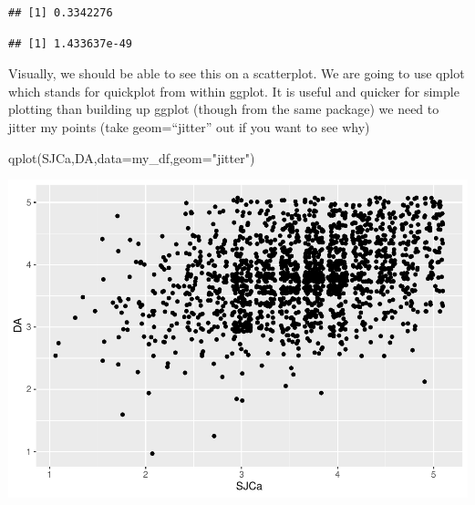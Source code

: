 \documentclass[
]{book}
\newenvironment{Shaded}{\begin{snugshade}}{\end{snugshade}}
\newcommand{\AttributeTok}[1]{\textcolor[rgb]{0.77,0.63,0.00}{#1}}
\newcommand{\CommentTok}[1]{\textcolor[rgb]{0.56,0.35,0.01}{\textit{#1}}}
\newcommand{\ConstantTok}[1]{\textcolor[rgb]{0.00,0.00,0.00}{#1}}
\newcommand{\FloatTok}[1]{\textcolor[rgb]{0.00,0.00,0.81}{#1}}
\newcommand{\FunctionTok}[1]{\textcolor[rgb]{0.00,0.00,0.00}{#1}}
\newcommand{\NormalTok}[1]{#1}
\newcommand{\SpecialCharTok}[1]{\textcolor[rgb]{0.00,0.00,0.00}{#1}}
\newcommand{\StringTok}[1]{\textcolor[rgb]{0.31,0.60,0.02}{#1}}
\begin{document}
\begin{verbatim}
## [1] 0.3342276
\end{verbatim}

\begin{Shaded}
\end{Shaded}

\begin{verbatim}
## [1] 1.433637e-49
\end{verbatim}

Visually, we should be able to see this on a scatterplot. We are going to use qplot which stands for quickplot from within ggplot. It is useful and quicker for simple plotting than building up ggplot (though from the same package) we need to jitter my points (take geom=``jitter'' out if you want to see why)

\begin{Shaded}
\begin{Highlighting}[]
\FunctionTok{qplot}\NormalTok{(SJCa,DA,}\AttributeTok{data=}\NormalTok{my\_df,}\AttributeTok{geom=}\StringTok{"jitter"}\NormalTok{)}
\end{Highlighting}
\end{Shaded}

\includegraphics{test_course_notes_files/figure-latex/unnamed-chunk-72-1.pdf}

\begin{Shaded}
\end{Shaded}
\end{document}
